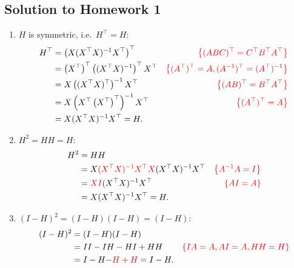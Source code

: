 \documentclass{article}
\begin{document}
  \subsection*{Solution to Homework 1}

  \begin{enumerate}
	\item $H$ is symmetric, i.e.~$H^\top = H$:
	\begin{align*}
	H^\top &= \left( X(X^\top X)^{-1}X^\top \right)^\top & {\color{red} \left\{ (ABC)^\top = C^\top B^\top A^\top \right\}}\\
	 &= \left(X^\top\right)^\top \left((X^\top X)^{-1}\right)^\top X^\top & {\color{red} \left\{ (A^\top)^\top = A, (A^{-1})^\top = (A^\top)^{-1} \right\}}\\
	 &= X \left((X^\top X)^\top\right)^{-1} X^\top & {\color{red} \left\{ (AB)^\top = B^\top A^\top \right\}}\\
	 &= X \left(X^\top \left(X^\top\right)^\top\right)^{-1} X^\top & {\color{red} \left\{ (A^\top)^\top = A \right\}}\\
	 &= X (X^\top X)^{-1} X^\top = H.
	\end{align*}
	\item $H^2 = HH = H$:
	\begin{align*}
	H^2 &= HH\\
	 &= X{\color{red} (X^\top X)^{-1}X^\top X}(X^\top X)^{-1}X^\top & {\color{red} \left\{ A^{-1} A = I \right\}}\\
	 &= {\color{red} XI}(X^\top X)^{-1}X^\top & {\color{red} \left\{ AI = A \right\}}\\
	 &= X(X^\top X)^{-1}X^\top = H.
	\end{align*}
	\item $(I-H)^2 = (I-H)(I-H) = (I-H)$:
	\begin{align*}
	(I-H)^2 &= (I-H)(I-H)\\
	 &= II - IH - HI + HH & {\color{red} \left\{ IA = A, AI = A, HH = H \right\}}\\
	 &= I - H {\color{red} - H + H} = I - H.
	\end{align*}
  \end{enumerate}
\end{document}
